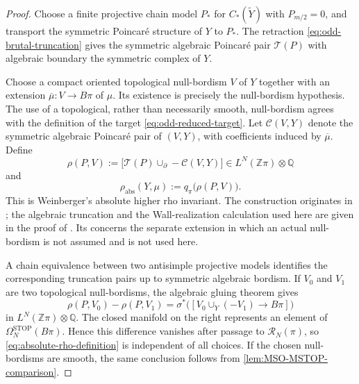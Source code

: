 \documentclass[10pt,reqno]{amsart}
\numberwithin{equation}{section}
\theoremstyle{definition}
\theoremstyle{remark}
\newcommand{\Z}{\mathbb Z}
\newcommand{\Q}{\mathbb Q}
\newcommand{\STOP}{\mathrm{STOP}}
\newcommand{\cR}{\mathcal R}
\newcommand{\rhoabs}{\rho_{\mathrm{abs}}}
\begin{document}
\begin{proof}
Choose a finite projective chain model \(P_*\) for
\(C_*(\widetilde Y)\) with \(P_{m/2}=0\), and transport the symmetric
Poincar\'e structure of \(Y\) to \(P_*\).  The retraction
\eqref{eq:odd-brutal-truncation} gives the symmetric algebraic
Poincar\'e pair \(\mathcal T(P)\) with algebraic boundary the symmetric
complex of \(Y\).

Choose a compact oriented topological null-bordism \(V\) of \(Y\)
together with an extension \(\overline\mu:V\to B\pi\) of \(\mu\).
Its existence is precisely the null-bordism hypothesis.  The use of a
topological, rather than necessarily smooth, null-bordism agrees with
the definition of the target \eqref{eq:odd-reduced-target}.  Let
\(\mathcal C(V,Y)\) denote the symmetric algebraic Poincar\'e pair of
\((V,Y)\), with coefficients induced by \(\overline\mu\).  Define
\begin{equation}\label{eq:absolute-rho-representative}
\rho(P,V)
:=
\bigl[
\mathcal T(P)\cup_{\partial}-\mathcal C(V,Y)
\bigr]
\in L^N(\Z\pi)\otimes\Q
\end{equation}
and
\begin{equation}\label{eq:absolute-rho-definition}
\rhoabs(Y,\mu)
:=q_\pi\bigl(\rho(P,V)\bigr).
\end{equation}
This is Weinberger's absolute higher rho invariant.  The construction
originates in \cite{WeinbergerRho}; the algebraic truncation and the
Wall-realization calculation used here are given in the proof of
\cite[Proposition~2.26]{DFW}.  Its
\cite[Remark~2.27]{DFW} concerns the separate extension in which an
actual null-bordism is not assumed and is not used here.

A chain equivalence between two antisimple projective models identifies
the corresponding truncation pairs up to symmetric algebraic bordism.
If \(V_0\) and \(V_1\) are two topological null-bordisms, the
algebraic gluing theorem gives
\begin{equation}\label{eq:absolute-rho-bordism-change}
\rho(P,V_0)-\rho(P,V_1)
=
\sigma^*\bigl(
[V_0\cup_Y(-V_1)\longrightarrow B\pi]
\bigr)
\end{equation}
in \(L^N(\Z\pi)\otimes\Q\).  The closed manifold on the right
represents an element of \(\Omega_N^{\STOP}(B\pi)\).  Hence this
difference vanishes after passage to \(\cR_N(\pi)\), so
\eqref{eq:absolute-rho-definition} is independent of all choices.  If
the chosen null-bordisms are smooth, the same conclusion follows from
\cref{lem:MSO-MSTOP-comparison}.


\end{proof}
\end{document}
